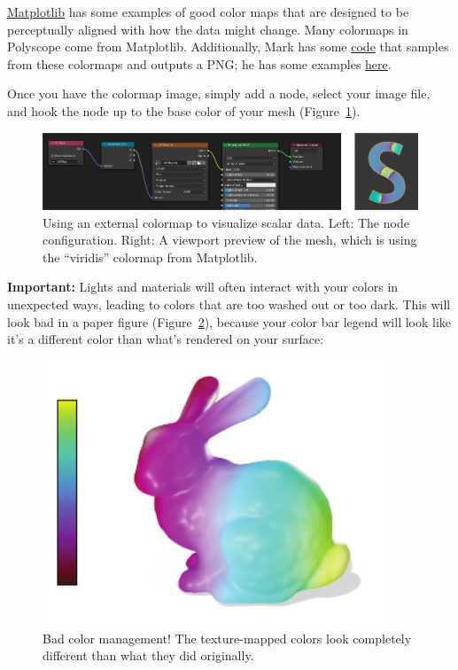 \documentclass[10pt]{article}
\newcommand{\obj}[1]{\menu{\color{magenta} #1}}
\begin{document}
\href{https://matplotlib.org/stable/gallery/color/colormap_reference.html}{Matplotlib} has some examples of good color maps that are designed to be perceptually aligned with how the data might change. Many colormaps in Polyscope come from Matplotlib. Additionally, Mark has some \href{https://github.com/MarkGillespie/geoptic.js/blob/main/misc/generate_colormap_constant.py}{code} that samples from these colormaps and outputs a PNG; he has some examples \href{https://github.com/MarkGillespie/geoptic.js/tree/main/img/colormaps}{here}. 

Once you have the colormap image, simply add a \obj{Image Texture} node, select your image file, and hook the node up to the base color of your mesh (Figure~\ref{fig:color-map-texture}).
\begin{figure}[H]
    \centering
    \captionsetup{width=0.8\linewidth}
    \includegraphics[width=0.9\linewidth]{images/color-map-texture.png}
    \caption{Using an external colormap to visualize scalar data. Left: The node configuration. Right: A viewport preview of the mesh, which is using the ``viridis'' colormap from Matplotlib.}
    \label{fig:color-map-texture}
\end{figure}


{\bf Important:} Lights and materials will often interact with your colors in unexpected ways, leading to colors that are too washed out or too dark. This will look bad in a paper figure (Figure~\ref{fig:bad-color-management}), because your color bar legend will look like it's a different color than what's rendered on your surface:
\begin{figure}[H]
    \centering
    \captionsetup{width=0.8\textwidth}
    \includegraphics[width=4in]{images/bad-color-management.pdf}
    \caption{Bad color management! The texture-mapped colors look completely different than what they did originally.}
    \label{fig:bad-color-management}
\end{figure}
\end{document}
